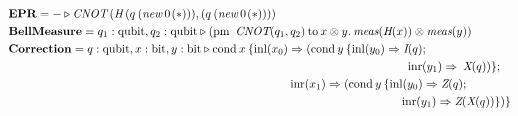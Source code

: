 \begin{align*}
  \hspace{-28pt} &\textbf{EPR} =  - \triangleright  \textit{CNOT} \hspace{2pt} (\textit{H}\hspace{2pt} (q  \hspace{2pt}    ( \textit{new}   \hspace{2pt}  0 \hspace{1pt}(*))),(q  \hspace{2pt}   ( \textit{new}   \hspace{2pt}  0 \hspace{1pt}(*))))  \\ 
      \hspace{-28pt}
      &\textbf{BellMeasure} =  q_{1}: \text{qubit}, q_{2}: \text{qubit}  \triangleright  (\text{pm}  \hspace{5pt} \textit{CNOT} (q_{1},q_{2})  \hspace{2pt}  \text{to} \hspace{2pt} x \otimes y.  \hspace{2pt}  \textit{meas} (\textit{H} (x)) \otimes \textit{meas} (y) ) \\
      \hspace{-28pt}
      &\textbf{Correction}= q: \text{qubit}, x: \text{bit},  y: \text{bit} \triangleright  \text{cond}\hspace{2pt} x  \hspace{2pt}  \{\text{inl} (x_{0}) \Rightarrow  (\text{cond}\hspace{2pt} y  \hspace{2pt}  \{\text{inl} (y_{0})  \Rightarrow{}  \textit{I}(q); \\
      \hspace{-28pt}
      & \hspace{335pt} \hspace{5pt} \text{inr} (y_{1}) \Rightarrow  \hspace{2pt}   \textit{X} (q))\} ; \\
      & \hspace{240pt}\text{inr} (x_{1})  \Rightarrow  (\text{cond}\hspace{2pt} y  \hspace{2pt}  \{\text{inl} (y_{0})  \Rightarrow   \textit{Z}(q);  \\
      \hspace{-28pt}
      &\hspace{335pt} \text{inr} (y_{1}) \Rightarrow{} \textit{Z} (\textit{X}(q)) \})\}
 \end{align*}


